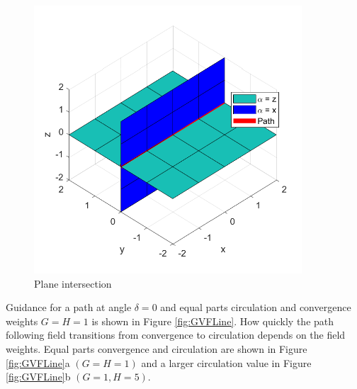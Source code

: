 \documentclass[conf]{new-aiaa}
\begin{document}
\begin{figure}[H]
	\centering
	\includegraphics[trim=0 20 0 20,clip,width=10cm]{Figures/planeIntersection}
	\caption{Plane intersection}
	\label{fig:planeIntersection}
\end{figure}

Guidance for a path at angle $\delta = 0$ and equal parts circulation and convergence weights $G=H=1$ is shown in Figure \ref{fig:GVFLine}. How quickly the path following field transitions from convergence to circulation depends on the field weights. Equal parts convergence and circulation are shown in Figure \ref{fig:GVFLine}a $(G=H=1)$ and a larger circulation value in Figure \ref{fig:GVFLine}b $(G=1, H=5)$.
\end{document}

